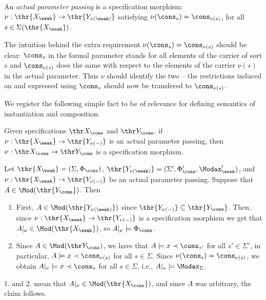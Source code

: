 \begin{definition}
An {\em actual parameter passing} is a specification morphism:
$\nu:\thr{X_\weak} \to \thr{Y_{\nu(\weak)}}$ satisfying
$\nu(\cons_s) = \cons_{\nu(s)}$, for all $s \in \Sigma(\thr{X_\weak})$.
\end{definition}
The intuition behind the extra requirement $\nu(\cons_s) = \cons_{\nu(s)}$
should be clear: $\cons_s$ in the formal parameter stands for all elements of
the carrier of sort $s$ and  $\cons_{\nu(s)}$ does the same with respect to the
elements of the carrier $\nu(s)$ in the actual parameter. Thus $\nu$ should
identify the two --  the restrictions induced on and expressed using
$\cons_s$ should now be transfered to $\cons_{\nu(s)}$.

We register the following simple fact to be of relevance for defining
semantics of instantiation and composition.

\begin{lemma}\label{le:id-^-1}
Given specifications $\thr X_\cons$ and $\thr Y_\cons$, 
if $\nu:\thr{X_\weak}\to \thr{Y_{\nu(-)}}$ is an actual parameter passing,
then $\nu:\thr X_\cons\to \thr Y_\cons$ is a specification morphism.
\end{lemma}
\begin{PROOF}
Let $\thr{X_\weak}=(\Sigma,\Phi_\cons)$,
$\thr{Y_{\nu(\weak)}}=(\Sigma',\Phi'_\cons,\Modax'_\weak)$, and $\nu:\thr
{X_\weak}\to \thr{Y_{\nu(-)}}$ be an actual parameter passing.
Suppose that $A \in \Mod(\thr{Y_\cons})$. Then
\begin{enumerate}
\item First, $A\in \Mod(\thr{Y_{\nu(\weak)}})$ since
$\thr{Y_{\nu(-)}}\subseteq \thr{Y_\cons}$. Then, since 
$\nu:\thr{X_\weak}\to \thr{Y_{\nu(-)}}$ is
	a specification morphism we get that $A|_\nu \in
	\Mod(\thr{X_\weak})$, so $A|_\nu \models \Phi_\cons$.

\item Since $A\in\Mod(\thr Y_\cons)$, we have that $A\models x\prec
\cons_{s'}$ for all $s'\in\Sigma'$, in particular, $A \models x
	\prec \cons_{\nu(s)}$ for all $s \in \Sigma$. 
Since $\nu(\cons_s) = \cons_{\nu(s)}$,  we obtain
	$A|_\nu \models x \prec \cons_s$ for all $s \in \Sigma$,
	i.e., $A|_\nu \models \Modax_\Sigma$.  
\end{enumerate} 
1. and 2. mean that $A|_\nu \in \Mod(\thr{X_\cons})$, and since $A$ was
arbitrary, the claim follows. 
\end{PROOF}
%

